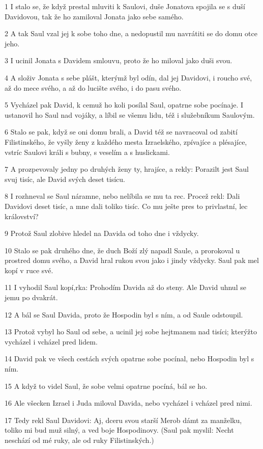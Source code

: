 \par 1 I stalo se, že když prestal mluviti k Saulovi, duše Jonatova spojila se s duší Davidovou, tak že ho zamiloval Jonata jako sebe samého.
\par 2 A tak Saul vzal jej k sobe toho dne, a nedopustil mu navrátiti se do domu otce jeho.
\par 3 I ucinil Jonata s Davidem smlouvu, proto že ho miloval jako duši svou.
\par 4 A složiv Jonata s sebe plášt, kterýmž byl odín, dal jej Davidovi, i roucho své, až do mece svého, a až do lucište svého, i do pasu svého.
\par 5 Vycházel pak David, k cemuž ho koli posílal Saul, opatrne sobe pocínaje. I ustanovil ho Saul nad vojáky, a líbil se všemu lidu, též i služebníkum Saulovým.
\par 6 Stalo se pak, když se oni domu brali, a David též se navracoval od zabití Filistinského, že vyšly ženy z každého mesta Izraelského, zpívajíce a plésajíce, vstríc Saulovi králi s bubny, s veselím a s huslickami.
\par 7 A prozpevovaly jedny po druhých ženy ty, hrajíce, a rekly: Porazilt jest Saul svuj tisíc, ale David svých deset tisícu.
\par 8 I rozhneval se Saul náramne, nebo nelíbila se mu ta rec. Procež rekl: Dali Davidovi deset tisíc, a mne dali toliko tisíc. Co mu ješte pres to privlastní, lec království?
\par 9 Protož Saul zlobive hledel na Davida od toho dne i vždycky.
\par 10 Stalo se pak druhého dne, že duch Boží zlý napadl Saule, a prorokoval u prostred domu svého, a David hral rukou svou jako i jindy vždycky. Saul pak mel kopí v ruce své.
\par 11 I vyhodil Saul kopí,rka: Prohodím Davida až do steny. Ale David uhnul se jemu po dvakrát.
\par 12 A bál se Saul Davida, proto že Hospodin byl s ním, a od Saule odstoupil.
\par 13 Protož vybyl ho Saul od sebe, a ucinil jej sobe hejtmanem nad tisíci; kterýžto vycházel i vcházel pred lidem.
\par 14 David pak ve všech cestách svých opatrne sobe pocínal, nebo Hospodin byl s ním.
\par 15 A když to videl Saul, že sobe velmi opatrne pocíná, bál se ho.
\par 16 Ale všecken Izrael i Juda miloval Davida, nebo vycházel i vcházel pred nimi.
\par 17 Tedy rekl Saul Davidovi: Aj, dceru svou starší Merob dámt za manželku, toliko mi bud muž silný, a ved boje Hospodinovy. (Saul pak myslil: Necht neschází od mé ruky, ale od ruky Filistinských.)
